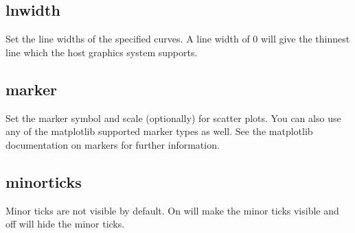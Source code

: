 \documentclass[letterpaper,10pt,english]{sphinxmanual}
\begin{document}
\subsection{lnwidth}
\label{\detokenize{plot_control_cmds:lnwidth}}
Set the line widths of the specified curves. A line width of 0 will give the thinnest line which the host graphics system supports.

\begin{sphinxVerbatim}[commandchars=\\\{\}]
\PYG{p}{[}\PYG{p}{]}   
\end{sphinxVerbatim}


\subsection{marker}
\label{\detokenize{plot_control_cmds:marker}}
Set the marker symbol and scale (optionally) for scatter plots. You can also use any of the matplotlib supported marker types as well. See the matplotlib documentation on markers for further information.

\begin{sphinxVerbatim}[commandchars=\\\{\}]
\PYG{p}{[}\PYG{p}{]}             \PYG{p}{[}\PYG{p}{]}
\end{sphinxVerbatim}


\subsection{minorticks}
\label{\detokenize{plot_control_cmds:minorticks}}
Minor ticks are not visible by default. On will make the minor ticks visible and off will hide the minor ticks.

\begin{sphinxVerbatim}[commandchars=\\\{\}]
\PYG{p}{[}\PYG{p}{]}    
\end{sphinxVerbatim}
\end{document}
